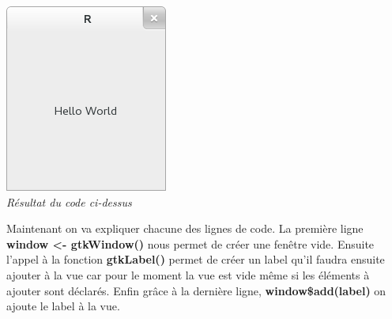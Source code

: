 \begin{center}
\includegraphics[scale=0.5]{hello.png}\\
\textit{Résultat du code ci-dessus}
\end{center}

Maintenant on va expliquer chacune des lignes de code. La première ligne \textbf{window <- gtkWindow()} nous permet de créer une fen\^etre vide. Ensuite l'appel à la fonction \textbf{gtkLabel()} permet de créer un label qu'il faudra ensuite ajouter à la vue car pour le moment la vue est vide m\^eme si les éléments à ajouter sont déclarés. Enfin gr\^ace à la dernière ligne, \textbf{window\$add(label)} on ajoute le label à la vue. \\





